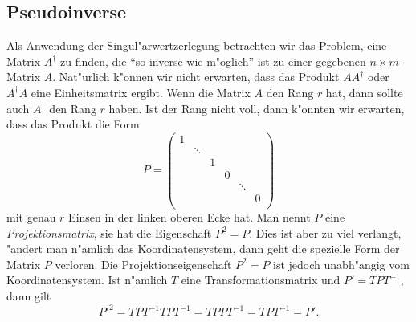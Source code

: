 \subsection{Pseudoinverse}
Als Anwendung der Singul"arwertzerlegung betrachten wir das Problem, eine Matrix
$A^\dagger$
zu finden, die ``so inverse wie m"oglich'' ist zu einer gegebenen
$n\times m$-Matrix $A$.
Nat"urlich k"onnen wir nicht erwarten, dass das Produkt $AA^\dagger$ 
oder $A^\dagger A$
eine Einheitsmatrix ergibt.
Wenn die Matrix $A$ den Rang $r$ hat, dann sollte auch $A^\dagger$ den Rang $r$
haben.
Ist der Rang nicht voll, dann k"onnten wir erwarten, dass das Produkt die Form
\[
P=
\begin{pmatrix}
1&      & & &      & \\
 &\ddots& & &      & \\
 &      &1& &      & \\
 &      & &0&      & \\
 &      & & &\ddots& \\
 &      & & &      &0\\
\end{pmatrix}
\]
mit genau $r$ Einsen in der linken oberen Ecke hat.
Man nennt $P$ eine {\em Projektionsmatrix}, sie hat die Eigenschaft $P^2=P$.
Dies ist aber zu viel verlangt, "andert man n"amlich das Koordinatensystem,
dann geht die spezielle Form der Matrix $P$ verloren.
Die Projektionseigenschaft $P^2=P$ ist jedoch unabh"angig vom Koordinatensystem.
Ist n"amlich $T$ eine Transformationsmatrix und $P'=TPT^{-1}$, dann gilt
\[
P'^2=TPT^{-1}TPT^{-1}=TPPT^{-1}=TPT^{-1}=P'.
\]

